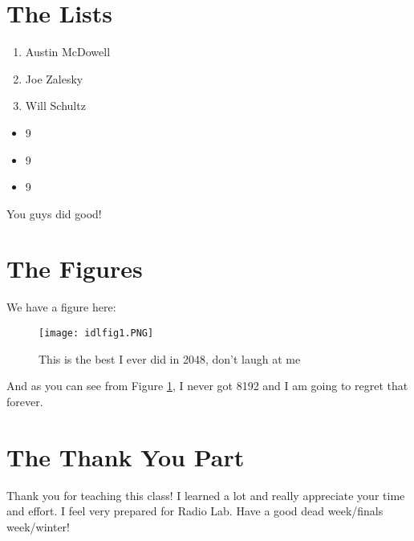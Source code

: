 \documentclass[12pt]{article}
\begin{document}
\section{The Lists}

\begin{enumerate}
\item Austin McDowell
\item Joe Zalesky
\item Will Schultz
\end{enumerate}

\begin{itemize}
\item 9
\item 9
\item 9
\end{itemize}

You guys did good!

\section{The Figures}
We have a figure here:
\begin{figure}[H]
\centering
\texttt{[image: idlfig1.PNG]}
\caption{\label{fig:f1}This is the best I ever did in 2048, don't laugh at me}
\end{figure}
And as you can see from Figure \ref{fig:f1}, I never got 8192
and I am going to regret that forever.

\section{The Thank You Part}
Thank you for teaching this class!
I learned a lot and really appreciate your time and effort.
I feel very prepared for Radio Lab.
Have a good dead week/finals week/winter!
\end{document}
